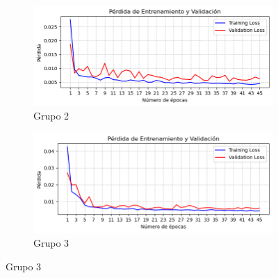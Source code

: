 \documentclass[12pt,a4paper]{report}
\begin{document}
\begin{figure}[H]
    \begin{subfigure}{0.45\textwidth}
        \centering
        \includegraphics[width=\textwidth]{Images/tfm-4.6.2.png}
        \caption{Grupo 2}
    \end{subfigure}
    \begin{subfigure}{0.45\textwidth}
        \centering
        \includegraphics[width=\textwidth]{Images/tfm-4.6.3.png}
        \caption{Grupo 3}
    \end{subfigure}
    

\end{figure}
\end{document}
